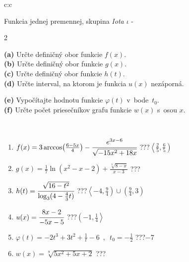 \documentclass[10pt]{report}
\begin{document}
\begin{tabular}{c:c}
\begin{minipage}[c][104.5mm][t]{0.5\linewidth}
\begin{center}
\vspace{7mm}
{\huge Funkcia jednej premennej, skupina \textit{Iota $\iota$} -}\\[5mm]
\begin{minipage}{0.95\linewidth}
\begin{center}
{\small \begin{multicols}{2} \raggedright
\textbf{(a)} Určte definičný obor funkcie \(f(x)\). \\[1mm]
\textbf{(b)} Určte definičný obor funkcie \(g(x)\). \\[1mm]
\textbf{(c)} Určte definičný obor funkcie \(h(t)\). \\[1mm]
\textbf{(d)} Určte interval, na ktorom je funkcia \(u(x)\) nezáporná. \par \columnbreak
\textbf{(e)} Vypočítajte hodnotu funkcie \(\varphi(t)\) v~bode~\(t_0\). \\[1mm]
\textbf{(f)} Určte počet priesečníkov grafu funkcie \(w(x)\) s~osou \(x\). \\[1mm]
\end{multicols}
}
\end{center}
\end{minipage}
\\[4mm]
\begin{minipage}{0.79\linewidth}
\begin{center}
\begin{varwidth}{\linewidth}
\begin{enumerate}
\small
\item $f(x) = 3\arccos\!\left( \frac{6-5x}{4} \right) - \cfrac{e^{3x-6}}{\sqrt{-15x^2+18x}}$\quad \dotfill\; ???\;\dotfill \quad $\left\langle\frac{2}{5} , \frac{6}{5}\right)$
\item $g(x) = \frac{1}{7} \ln{\!(x^2-x-2)}+\frac{\sqrt[3]{8-x}}{x-3}$\quad \dotfill\; ???\;\dotfill {}
\item $h(t) = \cfrac{\sqrt{16-t^2}}{\log_3(4-\frac{4}{3}t)}$\quad \dotfill\; ???\;\dotfill \quad $\left\langle-4 , \frac{9}{4}\right)\cup\left(\frac{9}{4} , 3\right)$
\item $u(x) = \cfrac{8x-2}{-5x-5}$\quad \dotfill\; ???\;\dotfill \quad $\left(-1 , \frac{1}{4}\right\rangle$
\item $\varphi(t) = -2t^3+3t^2+\frac{1}{t}-6 \enspace , \enspace t_0=-\frac{1}{2}$\quad \dotfill\; ???\;\dotfill \quad $-7$
\item $w(x) = \sqrt[9]{5x^2+5x+2}$\quad \dotfill\; ???\;\dotfill {}

\end{enumerate}
\end{varwidth}
\end{center}
\end{minipage}
\end{center}
\end{minipage}
\end{tabular}
\end{document}
